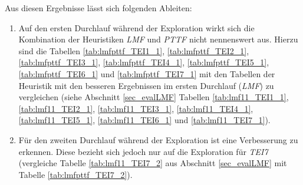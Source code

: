 \begin{multicols}{2}
\columnbreak
{}
\end{multicols}

\begin{multicols}{2}
\columnbreak
{}
\end{multicols}

\begin{multicols}{2}
\columnbreak
{}
\end{multicols}

\begin{multicols}{2}
\columnbreak
{}
\end{multicols}
\noindent
Aus diesen Ergebnisse lässt sich folgenden Ableiten:
\begin{enumerate}
\item Auf den ersten Durchlauf während der Exploration wirkt sich die Kombination der Heuristiken \emph{LMF} und \emph{PTTF} nicht nennenswert aus. Hierzu sind die Tabellen \ref{tab:lmfpttf_TEI1_1}, \ref{tab:lmfpttf_TEI2_1}, \ref{tab:lmfpttf_TEI3_1}, \ref{tab:lmfpttf_TEI4_1}, \ref{tab:lmfpttf_TEI5_1}, \ref{tab:lmfpttf_TEI6_1} und \ref{tab:lmfpttf_TEI7_1} mit den Tabellen der Heuristik mit den besseren Ergebnissen im ersten Durchlauf (\emph{LMF}) zu vergleichen (siehe Abschnitt \ref{sec_evalLMF} Tabellen \ref{tab:lmf11_TEI1_1}, \ref{tab:lmf11_TEI2_1}, \ref{tab:lmf11_TEI3_1}, \ref{tab:lmf11_TEI4_1}, \ref{tab:lmf11_TEI5_1}, \ref{tab:lmf11_TEI6_1} und \ref{tab:lmf11_TEI7_1}).
\item Für den zweiten Durchlauf während der Exploration ist eine Verbesserung zu erkennen. Diese bezieht sich jedoch nur auf die Exploration für \emph{TEI7} (vergleiche Tabelle \ref{tab:lmf11_TEI7_2} aus Abschnitt \ref{sec_evalLMF} mit Tabelle \ref{tab:lmfpttf_TEI7_2}).
\end{enumerate}

